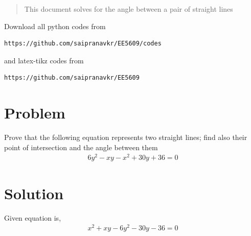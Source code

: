 \documentclass[journal,12pt,twocolumn]{IEEEtran}
\begin{document}
%
\begin{abstract}
This document solves for the angle between a pair of straight lines
\end{abstract}
Download all python codes from 
%
\begin{lstlisting}
https://github.com/saipranavkr/EE5609/codes
\end{lstlisting}
%
and latex-tikz codes from 
%
\begin{lstlisting}
https://github.com/saipranavkr/EE5609
\end{lstlisting}
%
\renewcommand{\theenumi}{\roman{enumi}}%
\section{Problem}
Prove that the following equation represents two straight lines; find also their point of intersection and the angle between them
\begin{align} 
    6y^{2}-xy-x^{2}+30y+36=0 \nonumber
\end{align}
%
%

\section{Solution}
Given equation is,
\begin{align} \label{eq:eq_1}
    x^{2}+xy-6y^{2}-30y-36=0 
\end{align}
\end{document}
